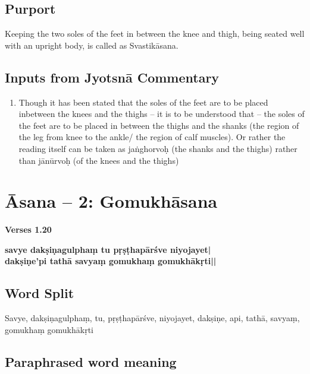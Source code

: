 \subsection*{Purport}
\vspace{-10pt}

Keeping the two soles of the feet in between the knee and thigh, being seated well with an upright body, is called as Svastikāsana.

\subsection*{Inputs from Jyotsnā Commentary}

\begin{enumerate}
\item Though it has been stated that the soles of the feet are to be placed inbetween the knees and the thighs – it is to be understood that – the soles of the feet are to be placed in between the thighs and the shanks (the region of the leg from knee to the ankle/ the region of calf muscles). Or rather the reading itself can be taken as jaṅghorvoḥ (the shanks and the thighs) rather than jānūrvoḥ (of the knees and the thighs)
\end{enumerate}
\newpage

\section*{Āsana -- 2: Gomukhāsana}

\noindent \textbf{Verses 1.20}

\begin{shloka}
\textbf{savye dakṣiṇagulphaṃ tu pṛṣṭhapārśve niyojayet|}\\
\textbf{dakṣiṇe'pi tathā savyaṃ gomukhaṃ gomukhākṛti||}
\end{shloka}


\subsection*{Word Split}

Savye, dakṣiṇagulphaṃ, tu, pṛṣṭhapārśve, niyojayet, dakṣiṇe, api, tathā, savyaṃ, gomukhaṃ gomukhākṛti

\subsection*{Paraphrased word meaning}

